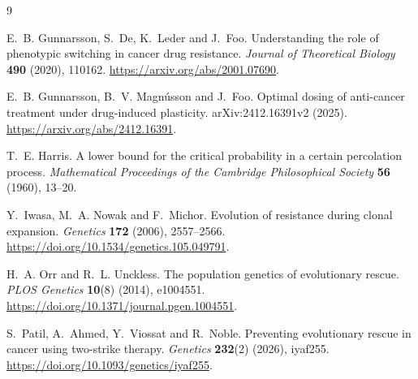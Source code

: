 \documentclass[11pt]{article}
\theoremstyle{remark}
\begin{document}
\begin{thebibliography}{9}

E.~B. Gunnarsson, S.~De, K.~Leder and J.~Foo.
Understanding the role of phenotypic switching in cancer drug resistance.
\emph{Journal of Theoretical Biology} \textbf{490} (2020), 110162.
\url{https://arxiv.org/abs/2001.07690}.

E.~B. Gunnarsson, B.~V. Magn\'usson and J.~Foo.
Optimal dosing of anti-cancer treatment under drug-induced plasticity.
arXiv:2412.16391v2 (2025). \url{https://arxiv.org/abs/2412.16391}.

T.~E. Harris.
A lower bound for the critical probability in a certain percolation process.
\emph{Mathematical Proceedings of the Cambridge Philosophical Society}
\textbf{56} (1960), 13--20.

Y.~Iwasa, M.~A. Nowak and F.~Michor.
Evolution of resistance during clonal expansion.
\emph{Genetics} \textbf{172} (2006), 2557--2566.
\url{https://doi.org/10.1534/genetics.105.049791}.

H.~A. Orr and R.~L. Unckless.
The population genetics of evolutionary rescue.
\emph{PLOS Genetics} \textbf{10}(8) (2014), e1004551.
\url{https://doi.org/10.1371/journal.pgen.1004551}.

S.~Patil, A.~Ahmed, Y.~Viossat and R.~Noble.
Preventing evolutionary rescue in cancer using two-strike therapy.
\emph{Genetics} \textbf{232}(2) (2026), iyaf255.
\url{https://doi.org/10.1093/genetics/iyaf255}.

\end{thebibliography}
\end{document}
